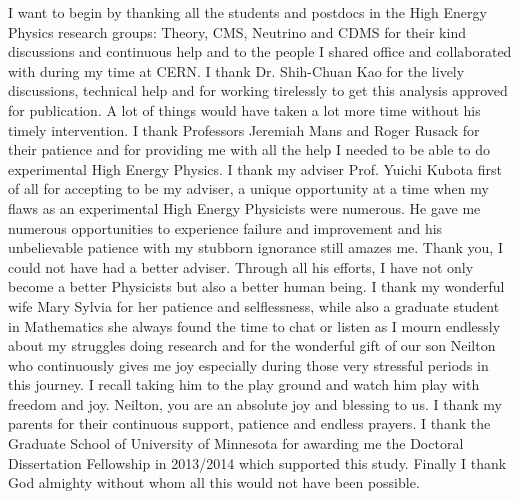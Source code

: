 I want to begin by thanking all the students and postdocs in the High Energy Physics research groups: Theory, CMS, Neutrino and CDMS for their kind discussions and continuous help and to the people I shared office and collaborated with during my time at CERN. I thank Dr. Shih-Chuan Kao for the lively discussions, technical help and for working tirelessly to get this analysis approved for publication. A lot of things would have taken a lot more time without his timely intervention.
I thank Professors Jeremiah Mans and Roger Rusack for their patience and for providing me with all the help I needed to be able to do experimental High Energy Physics.
\newline
I thank my adviser  Prof. Yuichi Kubota first of all for accepting to be my adviser, a unique opportunity at a time when my flaws as an experimental High Energy Physicists were numerous. He gave me numerous opportunities to experience failure and improvement and his unbelievable patience with my stubborn ignorance still amazes me. Thank you, I could not have had a better adviser. Through all his efforts, I have not only become a better Physicists but also a better human being.
\newline
I thank my wonderful wife Mary Sylvia for her patience and selflessness, while also a graduate student in Mathematics she always found the time to chat or listen as I mourn endlessly about my struggles doing research and for the wonderful gift of our son Neilton who continuously gives me joy especially during those very stressful periods in this journey. I recall taking him to the play ground and watch him play with freedom and joy. Neilton, you are an absolute joy and blessing to us.
I thank my parents for their continuous support, patience and endless prayers. 
\newline
I thank the Graduate School of University of Minnesota for awarding me the Doctoral Dissertation Fellowship in 2013/2014 which supported this study. \newline
Finally I thank God almighty without whom all this would not have been possible.



